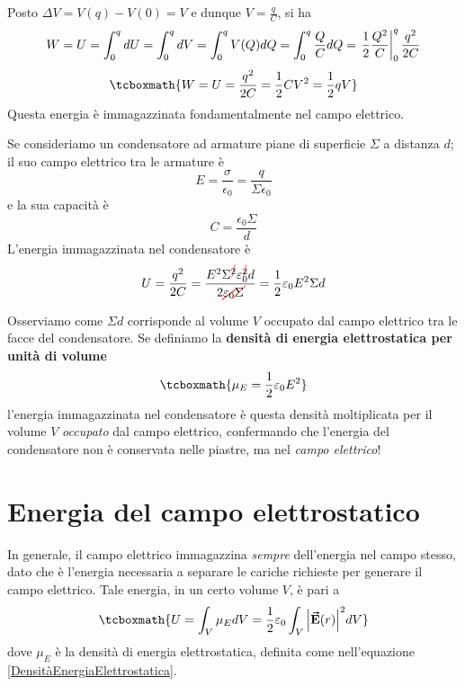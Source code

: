 Posto $\Delta V=V(q)-V(0)=V$ e dunque $V=\frac{q}{C}$, si ha
\begin{equation*}
	W=U=\int_{0}^{q}dU=\int_{0}^{q}dV=\int_0^{q}V(Q)dQ=\int_{0}^{q}\frac{Q}{C}dQ=\eval{\frac{1}{2}\frac{Q^2}{C}}_{0}^{q}\frac{q^2}{2C}
\end{equation*}
\begin{equation}
	\tcboxmath{W=U=\frac{q^2}{2C}=\frac{1}{2}CV^2=\frac{1}{2}qV}
\end{equation}
Questa energia è immagazzinata fondamentalmente nel campo elettrico.
\begin{examplewt}
	Se consideriamo un condensatore ad armature piane di superficie $\Sigma$ a distanza $d$; il suo campo elettrico tra le armature è
	\begin{equation*}
		E=\frac{\sigma}{\epsilon_0}=\frac{q}{\Sigma \epsilon_0}
	\end{equation*}
	e la sua capacità è
	\begin{equation*}
		C=\frac{\epsilon_0\Sigma}{d}
	\end{equation*}
	L'energia immagazzinata nel condensatore è
	\begin{equation*}
		U=\frac{q^2}{2C}=\frac{E^2\Sigma^{\Ccancel[red]{2}}\epsilon_0^{\Ccancel[red]{2}} d}{2\Ccancel[red]{\epsilon_0}\Ccancel[red]{\Sigma}}=\frac{1}{2}\epsilon_0E^2\Sigma d
	\end{equation*}
\end{examplewt} 
Osserviamo come $\Sigma d$ corrisponde al volume $V$ occupato dal campo elettrico tra le facce del condensatore. Se definiamo la \textbf{densità di energia elettrostatica per unità di volume}
\begin{equation}\label{DensitàEnergiaElettrostatica}
	\tcboxmath{\mu_{E}=\frac{1}{2}\epsilon_0E^2}
\end{equation}
l'energia immagazzinata nel condensatore è questa densità moltiplicata per il volume $V$ \textit{occupato} dal campo elettrico, confermando che l'energia del condensatore non è conservata nelle piastre, ma nel \textit{campo elettrico}!\\
\section{Energia del campo elettrostatico}
In generale, il campo elettrico immagazzina \textit{sempre} dell'energia nel campo stesso, dato che è l'energia necessaria a separare le cariche richieste per generare il campo elettrico. Tale energia, in un certo volume $V$, è pari a
\begin{equation}
	\tcboxmath{U=\int_V\mu_EdV=\frac{1}{2}\epsilon_0\int_V\abs{\vba{E}(r)}^2dV}
\end{equation}
dove $\mu_E$ è la densità di energia elettrostatica, definita come nell'equazione \eqref{DensitàEnergiaElettrostatica}.
